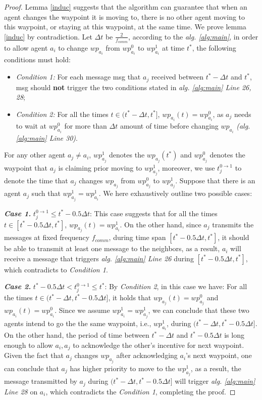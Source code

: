 \documentclass[journal]{IEEEtran}
\begin{document}
\begin{proof}
Lemma \ref{induc} suggests that the algorithm can guarantee that when an agent changes the waypoint it is moving to, there is no other agent moving to this waypoint, or staying at this waypoint, at the same time.
We prove lemma \ref{induc} by contradiction. Let $\Delta t$ be $\frac{2}{f_{comm}}$, according to the \textit{alg. \ref{alg:main}}, in order to allow agent $a_i$ to change $wp_{a_i}$ from $wp_{a_i}^0$ to $wp_{a_i}^1$ at time $t^*$, the following conditions must hold:
\begin{itemize}
   \item\textit{Condition 1:} For each message msg that $a_j$ received between $t^* - \Delta t$ and $t^*$, msg should \textbf{not} trigger the two conditions stated in \textit{alg. \ref{alg:main} Line 26, 28};
   \item\textit{Condition 2:} For all the times $t\in (t^* - \Delta t, t^*]$, $wp_{a_i}(t) = wp_{a_i}^0$, as $a_j$ needs to wait at $wp_{a_i}^0$ for more than $\Delta t$ amount of time before changing $wp_{a_i}$ \textit{(alg. \ref{alg:main} Line 30)}.
\end{itemize}

For any other agent $a_j \neq a_i$, $wp_{a_j}^1$ denotes the $wp_{a_j}(t^*)$ and $wp_{a_j}^0$ denotes the waypoint that $a_j$ is claiming prior moving to $wp_{a_j}^1$, moreover, we use $t_j^{0\rightarrow1}$ to denote the time that $a_j$ changes $wp_{a_j}$ from $wp_{a_j}^0$ to $wp_{a_j}^1$. Suppose that there is an agent $a_j$ such that $wp^1_{a_j} = wp_{a_i}^1$. We here exhaustively outline two possible cases:

\textit{\textbf{Case 1. }} $t_j^{0\rightarrow1} \leq t^*-0.5\Delta t$: This case suggests that for all the times $t\in[t^*-0.5\Delta t, t^*]$, $wp_{a_j}(t)=wp_{a_i}^1$. On the other hand, since $a_j$ transmits the messages at fixed frequency $f_{comm}$, during time span $[t^*-0.5\Delta t, t^*]$, it should be able to transmit at least one message to the neighbors, as a result, $a_i$ will receive a message that triggers \textit{alg. \ref{alg:main} {Line 26}} during $[t^*-0.5\Delta t, t^*]$, which contradicts to \textit{Condition 1}.


\textit{\textbf{Case 2. }} $t^*-0.5\Delta t< t_j^{0\rightarrow1}\leq t^*$: By \textit{Condition 2}, in this case we have: For all the times $t\in(t^*-\Delta t, t^*-0.5\Delta t]$, it holds that $wp_{a_j}(t)=wp_{a_j}^0$ and $ wp_{a_i}(t) = wp_{a_i}^0$. Since we assume $wp_{a_i}^1 = wp_{a_j}^1$, we can conclude that these two agents intend to go the the same waypoint, i.e., $wp_{a_i}^1$, during $(t^*-\Delta t, t^*-0.5\Delta t]$. On the other hand, the period of time between $t^* - \Delta t$ and $t^* - 0.5\Delta t$ is long enough to allow $a_i, a_j$ to acknowledge the other's incentive for next waypoint. Given the fact that $a_j$ changes $wp_{a_j}$ after acknowledging $a_i$'s next waypoint, one can conclude that $a_j$ has higher priority to move to the $wp_{a_j}^1$, as a result, the message transmitted by $a_j$ during $(t^*-\Delta t, t^*-0.5\Delta t]$ will trigger \textit{alg. \ref{alg:main} Line 28} on $a_i$, which contradicts the \textit{Condition 1}, completing the proof.   

\end{proof}
\end{document}
